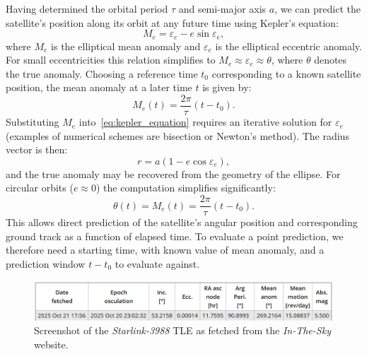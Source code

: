 \documentclass{article}
\begin{document}
Having determined the orbital period $\tau$ and semi-major axis $a$, we can predict the satellite’s position along its orbit at any future time using Kepler’s equation:
\begin{equation}
    \label{eq:kepler_equation}
    M_e = \varepsilon_e - e\sin \varepsilon_e,
\end{equation}
where $M_e$ is the elliptical mean anomaly and $\varepsilon_e$ is the elliptical eccentric anomaly. For small eccentricities this relation simplifies to $M_e \approx \varepsilon_e \approx \theta$, where $\theta$ denotes the true anomaly. Choosing a reference time $t_0$ corresponding to a known satellite position, the mean anomaly at a later time $t$ is given by:
\[
M_e(t) = \frac{2\pi}{\tau}(t - t_0).
\]
Substituting $M_e$ into~\eqref{eq:kepler_equation} requires an iterative solution for $\varepsilon_e$ (examples of numerical schemes are bisection or Newton's method). The radius vector is then:
\[
r = a(1 - e\cos \varepsilon_e),
\]
and the true anomaly may be recovered from the geometry of the ellipse. For circular orbits ($e \approx 0$) the computation simplifies significantly:
\[
\theta(t) = M_e(t) = \frac{2\pi}{\tau}(t - t_0).
\]
This allows direct prediction of the satellite’s angular position and corresponding ground track as a function of elapsed time. To evaluate a point prediction, we therefore need a starting time, with known value of mean anomaly, and a prediction window $t - t_0$ to evaluate against. 

\begin{figure}[h]
    \centering
    \includegraphics[width=\textwidth]{LaTeX/Figures/TLE_from_in_the_sky.png}
    \caption{Screenshot of the \textit{Starlink-3988} TLE as fetched from the \textit{In-The-Sky} website.}
    \label{fig:inthesky_tle}
\end{figure}
\end{document}
